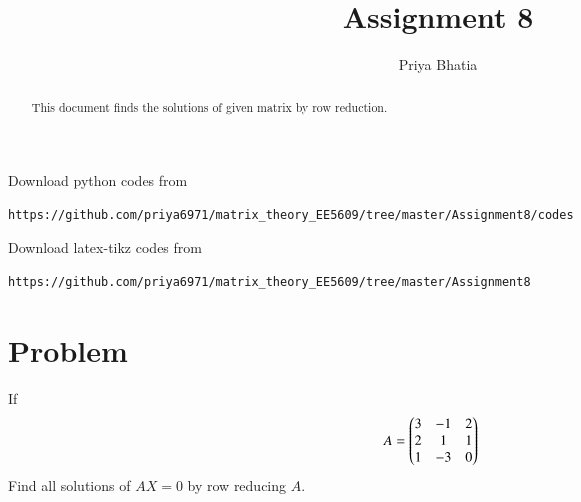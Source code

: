 \documentclass[journal,12pt,twocolumn]{IEEEtran}
\begin{document}
     \def\rightbox#1{\makebox[0in][r]{#1}}
     \def\centbox#1{\makebox[0in]{#1}}
     \def\topbox#1{\raisebox{-\baselineskip}[0in][0in]{#1}}
     \def\midbox#1{\raisebox{-0.5\baselineskip}[0in][0in]{#1}}
\vspace{3cm}
\title{Assignment 8}
\author{Priya Bhatia}
\maketitle
\newpage
\bigskip
\renewcommand{\thefigure}{\theenumi}
\renewcommand{\thetable}{\theenumi}
\begin{abstract}
This document finds the solutions of given matrix by row reduction.
\end{abstract}
%
Download python codes from 
%
\begin{lstlisting}
https://github.com/priya6971/matrix_theory_EE5609/tree/master/Assignment8/codes
\end{lstlisting}
%
%
%
Download latex-tikz codes from 
%
\begin{lstlisting}
https://github.com/priya6971/matrix_theory_EE5609/tree/master/Assignment8
\end{lstlisting}
%
\section{\textbf{Problem}}
If 
\begin{align}
    A &= \begin{pmatrix}3 & -1 & 2 \\
                2 & 1 & 1 \\
                1 & -3 & 0\end{pmatrix}
\end{align}     
Find all solutions of $AX = 0$ by row reducing $A$.
\end{document}
